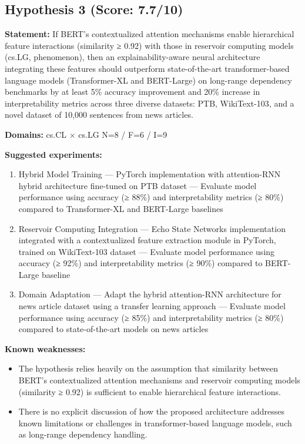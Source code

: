 \documentclass[12pt,a4paper]{article}
\begin{document}
\subsection*{Hypothesis 3 (Score: 7.7/10)}

\textbf{Statement:} If BERT's contextualized attention mechanisms enable hierarchical feature interactions (similarity ≥ 0.92) with those in reservoir computing models (cs.LG, phenomenon), then an explainability-aware neural architecture integrating these features should outperform state-of-the-art transformer-based language models (Transformer-XL and BERT-Large) on long-range dependency benchmarks by at least 5\% accuracy improvement and 20\% increase in interpretability metrics across three diverse datasets: PTB, WikiText-103, and a novel dataset of 10,000 sentences from news articles.

\noindent\textbf{Domains:} cs.CL $\times$ cs.LG
\hspace{1em} N=8 / F=6 / I=9

\textbf{Suggested experiments:}
\begin{enumerate}
  \item Hybrid Model Training — PyTorch implementation with attention-RNN hybrid architecture fine-tuned on PTB dataset — Evaluate model performance using accuracy (≥ 88\%) and interpretability metrics (≥ 80\%) compared to Transformer-XL and BERT-Large baselines
  \item Reservoir Computing Integration — Echo State Networks implementation integrated with a contextualized feature extraction module in PyTorch, trained on WikiText-103 dataset — Evaluate model performance using accuracy (≥ 92\%) and interpretability metrics (≥ 90\%) compared to BERT-Large baseline
  \item Domain Adaptation — Adapt the hybrid attention-RNN architecture for news article dataset using a transfer learning approach — Evaluate model performance using accuracy (≥ 85\%) and interpretability metrics (≥ 80\%) compared to state-of-the-art models on news articles
\end{enumerate}

\textbf{Known weaknesses:}
\begin{itemize}
  \item The hypothesis relies heavily on the assumption that similarity between BERT's contextualized attention mechanisms and reservoir computing models (similarity ≥ 0.92) is sufficient to enable hierarchical feature interactions.
  \item There is no explicit discussion of how the proposed architecture addresses known limitations or challenges in transformer-based language models, such as long-range dependency handling.
\end{itemize}
\end{document}
